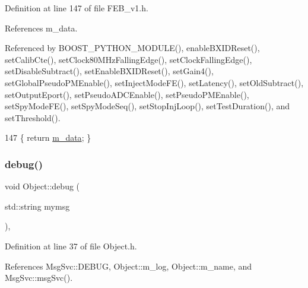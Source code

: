 Definition at line 147 of file F\+E\+B\+\_\+v1.\+h.



References m\+\_\+data.



Referenced by B\+O\+O\+S\+T\+\_\+\+P\+Y\+T\+H\+O\+N\+\_\+\+M\+O\+D\+U\+L\+E(), enable\+B\+X\+I\+D\+Reset(), set\+Calib\+Cte(), set\+Clock80\+M\+Hz\+Falling\+Edge(), set\+Clock\+Falling\+Edge(), set\+Disable\+Subtract(), set\+Enable\+B\+X\+I\+D\+Reset(), set\+Gain4(), set\+Global\+Pseudo\+P\+M\+Enable(), set\+Inject\+Mode\+F\+E(), set\+Latency(), set\+Old\+Subtract(), set\+Output\+Eport(), set\+Pseudo\+A\+D\+C\+Enable(), set\+Pseudo\+P\+M\+Enable(), set\+Spy\+Mode\+F\+E(), set\+Spy\+Mode\+Seq(), set\+Stop\+Inj\+Loop(), set\+Test\+Duration(), and set\+Threshold().


\begin{DoxyCode}
147 \{ \textcolor{keywordflow}{return} \hyperlink{classFEB__v1_a1c9dbc3660021dba1f58666d0097abb0}{m\_data}; \}
\end{DoxyCode}
\mbox{\label{classObject_aac010553f022165573714b7014a15f0d}} 
\subsubsection{\texorpdfstring{debug()}{debug()}\hspace{0.1cm}{\footnotesize\ttfamily [1/2]}}
{\footnotesize\ttfamily void Object\+::debug (\begin{DoxyParamCaption}\item[{std\+::string}]{mymsg }\end{DoxyParamCaption})\hspace{0.3cm}{\ttfamily [inline]}, {\ttfamily [inherited]}}



Definition at line 37 of file Object.\+h.



References Msg\+Svc\+::\+D\+E\+B\+UG, Object\+::m\+\_\+log, Object\+::m\+\_\+name, and Msg\+Svc\+::msg\+Svc().



